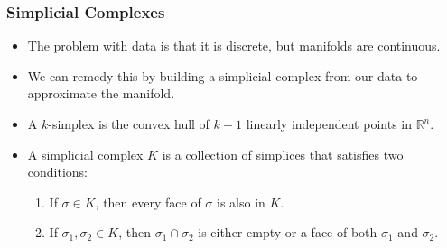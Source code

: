 \documentclass{beamer}
\begin{document}

\begin{frame}

\frametitle{Simplicial Complexes}

\begin{itemize}

\item The problem with data is that it is discrete, but manifolds are continuous.

\pause

\item We can remedy this by building a simplicial complex from our data to approximate the manifold.

\pause

\item A $k$-simplex is the convex hull of $k+1$ linearly independent points in $\mathbb{R}^n$.
\pause

\item A simplicial complex $K$ is a collection of simplices that satisfies two conditions:

\begin{enumerate}

\item If $\sigma \in K$, then every face of $\sigma$ is also in $K$.

\item If $\sigma_1, \sigma_2 \in K$, then $\sigma_1 \cap \sigma_2$ is either empty or a face of both
  $\sigma_1$ and $\sigma_2$.

\end{enumerate}



\end{itemize}
\end{frame}
\end{document}
